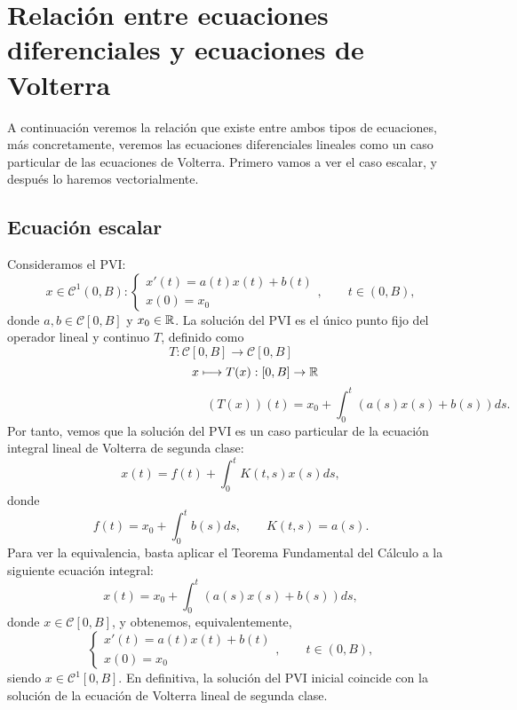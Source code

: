 \chapter{Relación entre ecuaciones diferenciales y ecuaciones de Volterra}
A continuación veremos la relación que existe entre ambos tipos de ecuaciones, más concretamente, veremos las ecuaciones diferenciales lineales como un caso particular de las ecuaciones de Volterra. Primero vamos a ver el caso escalar, y después lo haremos vectorialmente.
\section{Ecuación escalar}
Consideramos el PVI:
\begin{equation}
	x \in \mathcal{C}^1(0,B):\left\lbrace\begin{array}{c} x'(t) = a(t)x(t)+b(t) \\ x(0) = x_0 \end{array}\right.,\qquad t \in (0,B),
\end{equation}
donde $a,b \in \mathcal{C}[0,B]$ y $x_0 \in \mathbb{R}$.
La solución del PVI es el único punto fijo del operador lineal y continuo $T$, definido como
\begin{equation}
	T: \mathcal{C}[0,B] \longrightarrow \mathcal{C}[0,B]
\end{equation}
\begin{equation}
	\qquad \qquad x \longmapsto T(x): [0,B] \rightarrow \mathbb{R}
\end{equation}
\begin{equation}
	\qquad \qquad \qquad \qquad \qquad \qquad \qquad \qquad (T(x))(t) = x_0 + \int_0^t(a(s)x(s)+b(s))ds.
\end{equation}
Por tanto, vemos que la solución del PVI es un caso particular de la ecuación integral lineal de Volterra de segunda clase:
\begin{equation}
	x(t) = f(t) + \int_0^t K(t,s)x(s)ds,
\end{equation}
donde
\begin{equation}
	f(t) = x_0 + \int_0^t b(s)ds, \qquad K(t,s) = a(s).
\end{equation}
Para ver la equivalencia, basta aplicar el Teorema Fundamental del Cálculo a la siguiente ecuación integral:
\begin{equation}
	x(t) = x_0 + \int_0^t (a(s)x(s)+b(s))ds,
\end{equation}
donde $x \in \mathcal{C}[0,B]$, y obtenemos, equivalentemente,
\begin{equation}
	\left\lbrace\begin{array}{c} x'(t) = a(t)x(t)+b(t) \\ x(0) = x_0 \end{array}\right.,\qquad t \in (0,B),
\end{equation}
siendo $x \in \mathcal{C}^1[0,B]$. En definitiva, la solución del PVI inicial coincide con la solución de la ecuación de Volterra lineal de segunda clase.
